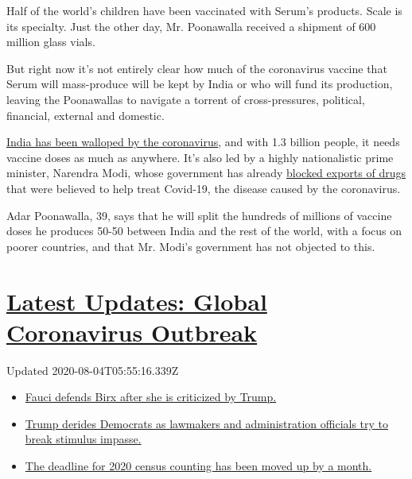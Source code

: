 Half of the world's children have been vaccinated with Serum's products.
Scale is its specialty. Just the other day, Mr. Poonawalla received a
shipment of 600 million glass vials.

But right now it's not entirely clear how much of the coronavirus
vaccine that Serum will mass-produce will be kept by India or who will
fund its production, leaving the Poonawallas to navigate a torrent of
cross-pressures, political, financial, external and domestic.

\href{https://www.nytimes.com/2020/07/16/world/asia/coronavirus-india-million-cases.html}{India
has been walloped by the coronavirus}, and with 1.3 billion people, it
needs vaccine doses as much as anywhere. It's also led by a highly
nationalistic prime minister, Narendra Modi, whose government has
already
\href{https://www.nytimes.com/2020/03/03/business/coronavirus-india-drugs.html}{blocked
exports of drugs} that were believed to help treat Covid-19, the disease
caused by the coronavirus.

Adar Poonawalla, 39, says that he will split the hundreds of millions of
vaccine doses he produces 50-50 between India and the rest of the world,
with a focus on poorer countries, and that Mr. Modi's government has not
objected to this.

\hypertarget{latest-updates-global-coronavirus-outbreak}{%
\section{\texorpdfstring{\href{https://www.nytimes.com/2020/08/03/world/coronavirus-covid-19.html?action=click\&pgtype=Article\&state=default\&region=MAIN_CONTENT_1\&context=storylines_live_updates}{Latest
Updates: Global Coronavirus
Outbreak}}{Latest Updates: Global Coronavirus Outbreak}}\label{latest-updates-global-coronavirus-outbreak}}

Updated 2020-08-04T05:55:16.339Z

\begin{itemize}
\tightlist
\item
  \href{https://www.nytimes.com/2020/08/03/world/coronavirus-covid-19.html?action=click\&pgtype=Article\&state=default\&region=MAIN_CONTENT_1\&context=storylines_live_updates\#link-4547638f}{Fauci
  defends Birx after she is criticized by Trump.}
\item
  \href{https://www.nytimes.com/2020/08/03/world/coronavirus-covid-19.html?action=click\&pgtype=Article\&state=default\&region=MAIN_CONTENT_1\&context=storylines_live_updates\#link-15e7f995}{Trump
  derides Democrats as lawmakers and administration officials try to
  break stimulus impasse.}
\item
  \href{https://www.nytimes.com/2020/08/03/world/coronavirus-covid-19.html?action=click\&pgtype=Article\&state=default\&region=MAIN_CONTENT_1\&context=storylines_live_updates\#link-e5a2cda}{The
  deadline for 2020 census counting has been moved up by a month.}
\end{itemize}

